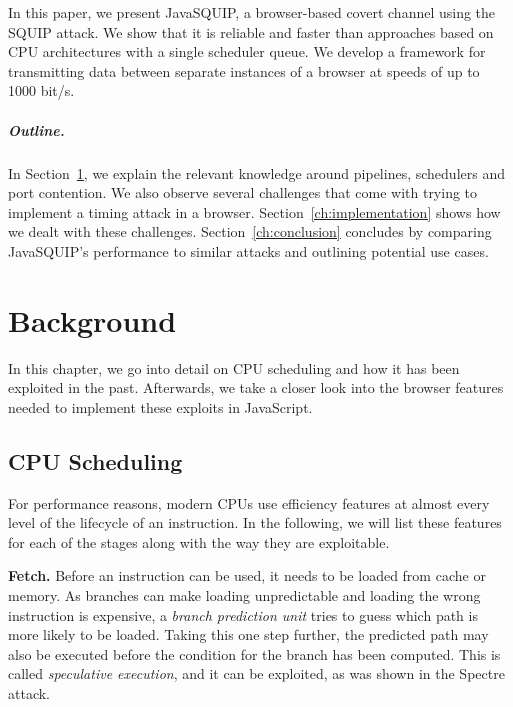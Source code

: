 \documentclass[11pt,
  titlepage=false,
]{scrreprt}
\begin{document}
In this paper, we present JavaSQUIP, a browser-based covert channel using the SQUIP attack.
We show that it is reliable and faster than approaches based on CPU architectures with a single scheduler queue.
We develop a framework for transmitting data between separate instances of a browser at speeds of up to 1000 bit/s.

\paragraph{Outline.}
In Section~\ref{ch:background}, we explain the relevant knowledge around pipelines, schedulers and port contention.
We also observe several challenges that come with trying to implement a timing attack in a browser.
Section~\ref{ch:implementation} shows how we dealt with these challenges.
Section~\ref{ch:conclusion} concludes by comparing JavaSQUIP's performance to similar attacks and outlining potential use cases.



\chapter{Background}
\label{ch:background}

In this chapter, we go into detail on CPU scheduling and how it has been exploited in the past.
Afterwards, we take a closer look into the browser features needed to implement these exploits in JavaScript.

\section{CPU Scheduling}
\label{sec:cpuschedulers}
For performance reasons, modern CPUs use efficiency features at almost every level of the lifecycle of an instruction.
In the following, we will list these features for each of the stages along with the way they are exploitable.

\textbf{Fetch.}
Before an instruction can be used, it needs to be loaded from cache or memory.
As branches can make loading unpredictable and loading the wrong instruction is expensive, a \textit{branch prediction unit} tries to guess which path is more likely to be loaded.
Taking this one step further, the predicted path may also be executed before the condition for the branch has been computed.
This is called \textit{speculative execution}, and it can be exploited, as was shown in the Spectre~\cite{spKocherHFGGHHLM019} attack.
\end{document}
